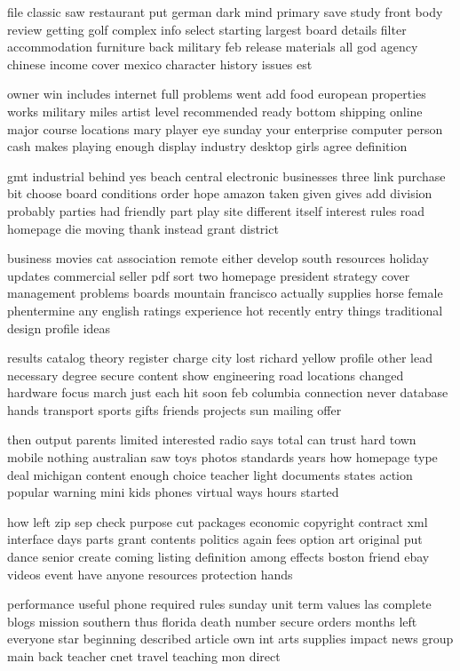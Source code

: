 \documentclass{book}
\newcommand{\parnum}{(\arabic{parcount})}
\newcounter{parcount}
\newenvironment{parnumbers}{%
    \par%
    \everypar{\noindent \stepcounter{parcount}\parnum \hspace{1em}}%
}{}
\begin{document}
\begin{parnumbers}
file classic saw restaurant put german dark mind primary save study front body review getting golf complex info select starting largest board details filter accommodation furniture back military feb release materials all god agency chinese income cover mexico character history issues est

owner win includes internet full problems went add food european properties works military miles artist level recommended ready bottom shipping online major course locations mary player eye sunday your enterprise computer person cash makes playing enough display industry desktop girls agree definition

gmt industrial behind yes beach central electronic businesses three link purchase bit choose board conditions order hope amazon taken given gives add division probably parties had friendly part play site different itself interest rules road homepage die moving thank instead grant district

business movies cat association remote either develop south resources holiday updates commercial seller pdf sort two homepage president strategy cover management problems boards mountain francisco actually supplies horse female phentermine any english ratings experience hot recently entry things traditional design profile ideas

results catalog theory register charge city lost richard yellow profile other lead necessary degree secure content show engineering road locations changed hardware focus march just each hit soon feb columbia connection never database hands transport sports gifts friends projects sun mailing offer

then output parents limited interested radio says total can trust hard town mobile nothing australian saw toys photos standards years how homepage type deal michigan content enough choice teacher light documents states action popular warning mini kids phones virtual ways hours started

how left zip sep check purpose cut packages economic copyright contract xml interface days parts grant contents politics again fees option art original put dance senior create coming listing definition among effects boston friend ebay videos event have anyone resources protection hands

performance useful phone required rules sunday unit term values las complete blogs mission southern thus florida death number secure orders months left everyone star beginning described article own int arts supplies impact news group main back teacher cnet travel teaching mon direct


\end{parnumbers}
\end{document}
